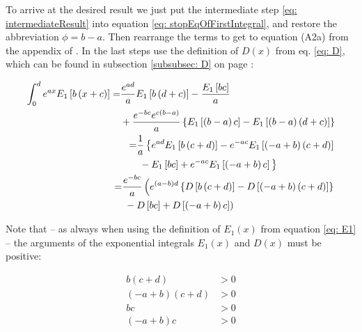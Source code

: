 \documentclass[bibliography=totocnumbered]{scrartcl}
\begin{document}
	To arrive at the desired result we just put the intermediate step \eqref{eq: intermediateResult} into equation \eqref{eq: stopEqOfFirstIntegral}, and restore the abbreviation $\phi=b-a$. Then rearrange the terms to get to equation (A2a) from the appendix of \cite{boer1990calc}. In the last steps use the definition of $D\left(x\right)$ from eq. \eqref{eq: D}, which can be found in subsection \ref{subsubsec: D} on page \pageref{subsubsec: D}:

	\begin{align}
			\begin{split}
				\int_{0}^{d}e^{ax}E_1\left[b\left(x+c\right)\right]=&\frac{e^{ad}}{a}E_1\left[b\left(d+c\right)\right]-\frac{E_1\left[bc\right]}{a}\\
				&+\frac{e^{-bc}e^{c\left(b-a\right)}}{a}\left\{E_1\left[\left(b-a\right)c\right]-E_1\left[\left(b-a\right)\left(d+c\right)\right]\right\}
			\end{split}\\
			\begin{split}
				=&\frac{1}{a}\left\{e^{ad}E_1\left[b\left(c+d\right)\right]-e^{-ac}E_1\left[\left(-a+b\right)\left(c+d\right)\right]\right. \\
				&\left. {}-E_1\left[bc\right]+e^{-ac}E_1\left[\left(-a+b\right)c\right]\vphantom{e^{ad}}\right\}
			\end{split}\\
			\begin{split}
				=&\frac{e^{-bc}}{a}\left(e^{\left(a-b\right)d}\left\{D\left[b\left(c+d\right)\right]-D\left[\left(-a+b\right)\left(c+d\right)\right]\right\}\right.\\
				&\left. {}-D\left[bc\right]+D\left[\left(-a+b\right)c\right]\right)\label{eq: generalIntegralOfE1}
			\end{split}
	\end{align}

	Note that -- as always when using the definition of $E_1\left(x\right)$ from equation \eqref{eq: E1}  -- the arguments of the exponential integrals $E_1\left(x\right)$ and $D\left(x\right)$ must be positive:

	\begin{subequations}
	\begin{align}
		b\left(c+d\right)&>0\\
		\left(-a+b\right)\left(c+d\right)&>0\\
		bc&>0\label{eq: conditionForC1}\\
		\left(-a+b\right)c&>0\label{eq: conditionForC2}
	\end{align}
	\end{subequations}
\end{document}
